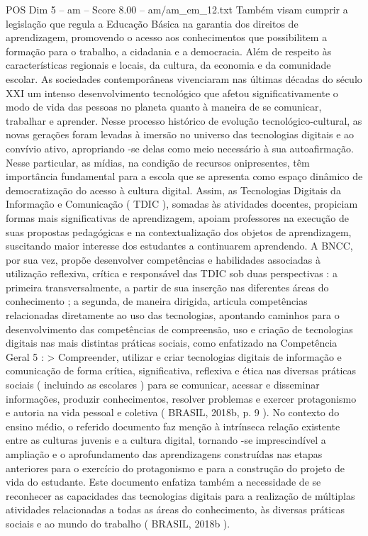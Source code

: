\begin{textsample}{POS Dim 5 – am – Score 8.00 – am/am\_em\_12.txt}
Também visam cumprir a legislação que regula a Educação Básica na garantia dos direitos de aprendizagem, promovendo o acesso aos conhecimentos que possibilitem a formação para o trabalho, a cidadania e a democracia.
Além de respeito às características regionais e locais, da cultura, da economia e da comunidade escolar.
As sociedades contemporâneas vivenciaram nas últimas décadas do século XXI um intenso desenvolvimento tecnológico que afetou significativamente o modo de vida das pessoas no planeta quanto à maneira de se comunicar, trabalhar e aprender.
Nesse processo histórico de evolução tecnológico-cultural, as novas gerações foram levadas à imersão no universo das tecnologias digitais e ao convívio ativo, apropriando -se delas como meio necessário à sua autoafirmação.
Nesse particular, as mídias, na condição de recursos onipresentes, têm importância fundamental para a escola que se apresenta como espaço dinâmico de democratização do acesso à cultura digital.
Assim, as Tecnologias Digitais da Informação e Comunicação ( TDIC ), somadas às atividades docentes, propiciam formas mais significativas de aprendizagem, apoiam professores na execução de suas propostas pedagógicas e na contextualização dos objetos de aprendizagem, suscitando maior interesse dos estudantes a continuarem aprendendo.
A BNCC, por sua vez, propõe desenvolver competências e habilidades associadas à utilização reflexiva, crítica e responsável das TDIC sob duas perspectivas : a primeira transversalmente, a partir de sua inserção nas diferentes áreas do conhecimento ; a segunda, de maneira dirigida, articula competências relacionadas diretamente ao uso das tecnologias, apontando caminhos para o desenvolvimento das competências de compreensão, uso e criação de tecnologias digitais nas mais distintas práticas sociais, como enfatizado na Competência Geral 5 : > Compreender, utilizar e criar tecnologias digitais de informação e comunicação de forma crítica, significativa, reflexiva e ética nas diversas práticas sociais ( incluindo as escolares ) para se comunicar, acessar e disseminar informações, produzir conhecimentos, resolver problemas e exercer protagonismo e autoria na vida pessoal e coletiva ( BRASIL, 2018b, p. 9 ).
No contexto do ensino médio, o referido documento faz menção à intrínseca relação existente entre as culturas juvenis e a cultura digital, tornando -se imprescindível a ampliação e o aprofundamento das aprendizagens construídas nas etapas anteriores para o exercício do protagonismo e para a construção do projeto de vida do estudante.
Este documento enfatiza também a necessidade de se reconhecer as capacidades das tecnologias digitais para a realização de múltiplas atividades relacionadas a todas as áreas do conhecimento, às diversas práticas sociais e ao mundo do trabalho ( BRASIL, 2018b ).

\end{textsample}

